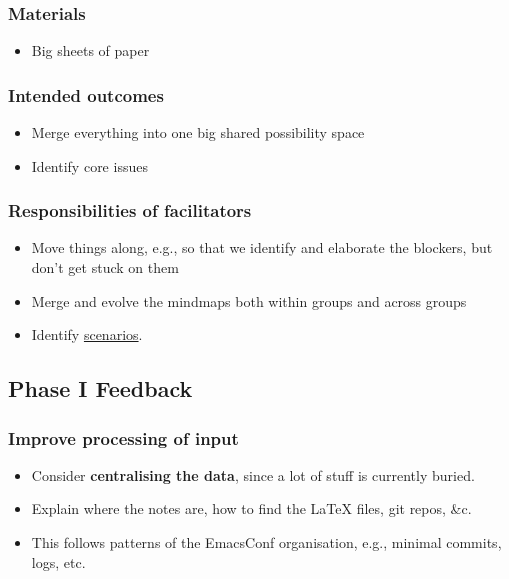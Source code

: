\documentclass{article}
\begin{document}
\subsubsection{Materials}
\begin{itemize}
\item Big sheets of paper
\end{itemize}

\subsubsection{Intended outcomes}
\begin{itemize}
\item Merge everything into one big shared possibility space
\item Identify core issues
\end{itemize}

\subsubsection{Responsibilities of facilitators}

\begin{itemize}
\item Move things along, e.g., so that we identify and elaborate the blockers, but don’t get stuck on them
\item Merge and evolve the mindmaps both within groups and across groups
\item Identify \href{../../git-repos/exp2exp.github.io/src/20221121191049-kw_scenarios.org}{scenarios}.
\end{itemize}

\subsection{Phase I Feedback}

\subsubsection{Improve processing of input}
\begin{itemize}
\item Consider \textbf{centralising the data}, since a lot of stuff is currently buried.
\item Explain where the notes are, how to find the \LaTeX{} files, git repos, \&c.
\item This follows patterns of the EmacsConf organisation, e.g., minimal commits, logs, etc.
\end{itemize}
\end{document}
